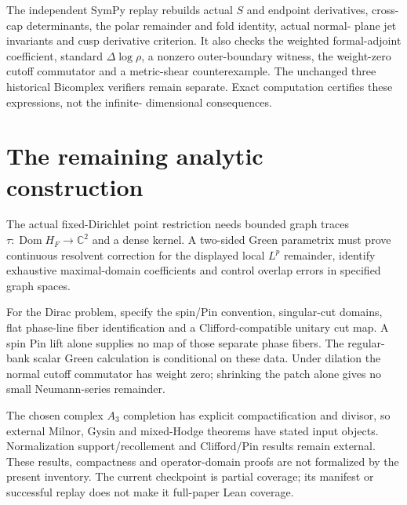 \documentclass[11pt]{article}
\newcommand{\C}{\mathbb C}\newcommand{\R}{\mathbb R}
\begin{document}
The independent SymPy replay rebuilds actual $S$ and endpoint derivatives,
cross-cap determinants, the polar remainder and fold identity, actual normal-
plane jet invariants and cusp derivative criterion. It also checks the weighted
formal-adjoint coefficient, standard $\Delta\log\rho$, a nonzero
outer-boundary witness, the weight-zero cutoff commutator and a metric-shear
counterexample. The unchanged three historical Bicomplex verifiers remain
separate. Exact computation certifies these expressions, not the infinite-
dimensional consequences.

\section{The remaining analytic construction}
The actual fixed-Dirichlet point restriction needs bounded graph traces
$\tau:\operatorname{Dom}H_F\to\C^2$ and a dense kernel. A two-sided
Green parametrix must prove continuous resolvent correction for the displayed
local $L^p$ remainder, identify exhaustive maximal-domain coefficients and
control overlap errors in specified graph spaces.

For the Dirac problem, specify the spin/Pin convention, singular-cut domains,
flat phase-line fiber identification and a Clifford-compatible unitary cut
map. A spin Pin lift alone supplies no map of those separate phase fibers.
The regular-bank scalar Green calculation is conditional on these data.
Under dilation the normal cutoff commutator has weight zero; shrinking the
patch alone gives no small Neumann-series remainder.

The chosen complex $A_3$ completion has explicit compactification and divisor,
so external Milnor, Gysin and mixed-Hodge theorems have stated input objects.
Normalization support/recollement and Clifford/Pin results remain external.
These results, compactness and operator-domain proofs are not formalized by
the present inventory. The current checkpoint is partial coverage; its
manifest or successful replay does not make it full-paper Lean coverage.
\end{document}
